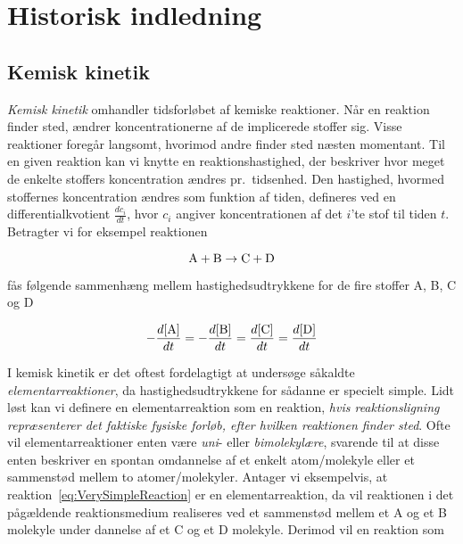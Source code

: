 \pageheaderlinetrue
\evenpageheader{\bsf\leftmark}{}{}
\oddpageheader{}{}{\bsf\rightmark}
\evenpagefooter{\thepage}{}{}
\oddpagefooter{}{}{\thepage}

\chapter{Historisk indledning}
\label{cha:Historie}
\section{Kemisk kinetik}
{\em Kemisk kinetik\/} omhandler tidsforl{\o}bet af kemiske
reaktioner. N{\aa}r en reaktion finder sted, {\ae}ndrer
koncentrationerne af de implicerede stoffer sig. Visse
reaktioner foreg{\aa}r langsomt, hvorimod andre finder sted
n{\ae}sten momentant. Til en given reaktion kan vi knytte
en reaktions\-hastighed, der beskriver hvor meget de
enkelte stoffers koncentration {\ae}ndres pr.\ tidsenhed.
Den hastighed, hvormed stoffernes koncentration {\ae}ndres
som funktion af tiden, defineres ved en
differentialkvotient $\frac{dc_i}{dt}$, hvor $c_i$ angiver
koncentrationen af det $i$'te stof til tiden $t$. Betragter
vi for eksempel reaktionen

\begin{equation}
  {\rm A} + {\rm B}  \rightarrow {\rm C} + {\rm D}
  \label{eq:VerySimpleReaction}
\end{equation}

f{\aa}s f{\o}lgende sammenh{\ae}ng mellem
hastigheds\-udtrykkene for de fire stoffer A, B, C og D

\begin{equation}
 - \frac{d{\rm [A]}}{dt} =
 - \frac{d{\rm [B]}}{dt} =
   \frac{d{\rm [C]}}{dt} =
   \frac{d{\rm [D]}}{dt}
\end{equation}

I kemisk kinetik er det oftest fordelagtigt at unders{\o}ge
s{\aa}kaldte {\em elementarreaktioner\/}, da
hastigheds\-udtrykkene for s{\aa}danne er specielt simple.
Lidt l{\o}st kan vi definere en elementarreaktion som en
reaktion, {\em hvis reaktions\-lig\-ning repr{\ae}senterer
det faktiske fysiske forl{\o}b, efter hvilken reaktionen
finder sted\/}. Ofte vil elementarreaktioner enten v{\ae}re
{\em uni\/}- eller {\em bimolekyl{\ae}re\/}, svarende til
at disse enten beskriver en spontan omdannelse af et enkelt
atom/molekyle eller et sammenst{\o}d mellem to
atomer/molekyler. Antager vi eksempelvis, at
reaktion~\ref{eq:VerySimpleReaction} er en
elementarreaktion, da vil reaktionen i det
p{\aa}g{\ae}ldende reaktions\-medium realiseres ved et
sammenst{\o}d mellem et A og et B molekyle under dannelse
af et C og et D molekyle. Derimod vil en reaktion som

